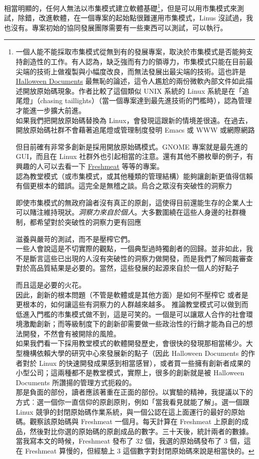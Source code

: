\documentclass[10pt, b5paper]{book}
\makeatletter
\newcommand*{\shifttext}[2]{%
  \settowidth{\@tempdima}{#2}%
  \makebox[\@tempdima]{\hspace*{#1}#2}%
}
\makeatother
\begin{document}
相當明顯的，任何人無法以市集模式建立軟體基礎\footnote{一個人能不能採取市集模式從無到有的發展專案，取決於市集模式是否能夠支持創造性的工作。有人認為，缺乏強而有力的領導力，市集模式只能在目前最尖端的技術上做複製與小幅度改良，而無法發展出最尖端的技術。這也許是
  \href{http://www.opensource.org/halloween/}{Halloween Documents}
  最無恥的論述，這令人尷尬的兩份微軟內部文件如此描述開放原始碼現象。作者比較了這個類似
  UNIX 系統的 Linux 系統是在「追尾燈」（chasing
  taillights）（當一個專案達到最先進技術的門檻時），認為管理才能進一步擴大前進。\\如果我們把開放原始碼替換為
  Linux，會發現這跟新的情境差很遠。在過去，開放原始碼社群不會藉著追尾燈或管理制度發明
  Emacs 或 WWW 或網際網路 \shifttext{1pt}{---}\shifttext{-1pt}{---}
  但目前確有非常多創新是採用開放原始碼模式。GNOME 專案就是最先進的
  GUI，而且在 Linux
  社群外也引起相當的注意。還有其他不勝枚舉的例子，有興趣的人可以去看一下
  \href{http://freshmeat.net/}{Freshmeat}
  等等的專案。\\認為教堂模式（或市集模式，或其他種類的管理結構）能夠讓創新更值得信賴有個更根本的錯誤。這完全是無稽之談。烏合之眾沒有突破性的洞察力
  \shifttext{1pt}{---}\shifttext{-1pt}{---}
  即使市集模式的無政府論者沒有真正的原創，這使得目前還能生存的企業人士可以賭注維持現狀。\emph{洞察力來自於個人}。大多數圍繞在這些人身邊的社群機制，都希望對於突破性的洞察力更有回應
  \shifttext{1pt}{---}\shifttext{-1pt}{---}
  滋養與嚴苛的測試，而不是壓榨它們。\\一些人會說這是不切實際的觀點，一個典型過時獨創者的回歸。並非如此，我不是斷言這些已出現的人沒有突破性的洞察力做開發，而是我們了解同裁審查對於高品質結果是必要的。當然，這些發展的起源來自於一個人的好點子
  \shifttext{1pt}{---}\shifttext{-1pt}{---}
  而且這是必要的火花。\\因此，創新的根本問題（不管是軟體或是其他方面）是如何不壓榨它
  \shifttext{1pt}{---}\shifttext{-1pt}{---} 或者是更根本的，如何讓這些有洞察力的人群越來越多。
  推論教堂模式可以做到而低進入門檻的市集模式做不到，這是可笑的。一個是可以讓眾人合作的社會環境激勵創新；而等級制度下的創新卻需要做一些政治性的行銷才能為自己的想法開發，不然會有被開除的風險。\\如果我們看一下採用教堂模式的軟體開發歷史，會很快的發現那相當稀少。大型機構依賴大學的研究中心來發展新的點子（因此
  Halloween Documents 的作者對於 Linux
  的快速開發成果感到相當感冒），或者買一些擁有創新者成果的小型公司；這兩種都不是教堂模式，實際上，很多的創新就是被
  Halloween Documents
  所讚揚的管理方式扼殺的。\\那是負面的部份，讀者應該著重在正面的部份。以實驗的精神，我提議以下的方式︰選一個你一直信仰的原創原則，例如「當我看見就能了解」。選一個跟
  Linux
  競爭的封閉原始碼作業系統，與一個公認在這上面運行的最好的原始碼。觀察該原始碼與
  Freshmeat 一個月。每天計算在 Freshmeat
  上原創的成品，然後對比你選的原始碼的原創成品的數字。三十天後，統計兩者的數據。\\當我寫本文的時候，Freshmeat
  發布了 32 個，我選的原始碼發布了 3 個，這在 Freshmeat 算慢的，但經驗上 3
  這個數字對封閉原始碼來說是相當快的。}，但是可以用市集模式來測試，除錯，改進軟體，在一個專案的起始點很難運用市集模式，Linus
沒試過，我也沒有。專案初始的協同發展團隊需要有一些東西可以測試，可以執行。
\end{document}
